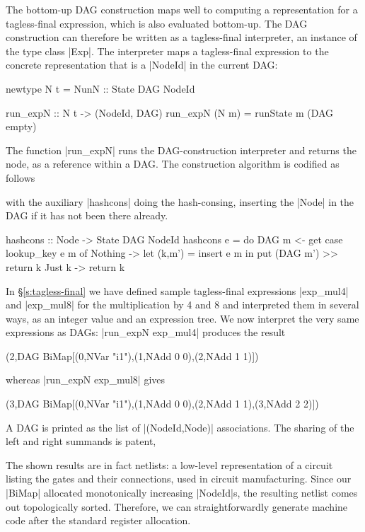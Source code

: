 \documentclass[submission,copyright,creativecommons]{eptcs}
\begin{document}
The bottom-up DAG construction maps well to computing a representation
for a tagless-final expression, which is also evaluated bottom-up. The
DAG construction can therefore be written as a tagless-final
interpreter, an instance of the type class |Exp|. The interpreter maps
a tagless-final expression to the concrete representation that is a
|NodeId| in the current DAG:
\begin{code}
newtype N t = N{unN :: State DAG NodeId}

run_expN :: N t -> (NodeId, DAG)
run_expN (N m) = runState m (DAG empty)
\end{code}
The function |run_expN| runs the DAG-construction interpreter and
returns the node, as a reference within a DAG. The construction
algorithm is codified as follows
with the auxiliary |hashcons| doing the hash-consing, inserting the
|Node| in the DAG if it has not been there already.
\begin{code}
hashcons :: Node -> State DAG NodeId
hashcons e = do
  DAG m <- get
  case lookup_key e m of
    Nothing -> let (k,m') = insert e m
               in put (DAG m') >> return k
    Just k  -> return k
\end{code}

In \S\ref{s:tagless-final} we have defined sample tagless-final
expressions |exp_mul4| and |exp_mul8| for the multiplication by 4 and 8
and interpreted them in several ways, as an integer value and an
expression tree. We now interpret the very same expressions as DAGs:
|run_expN exp_mul4| produces the result
\begin{code}
(2,DAG BiMap[(0,NVar "i1"),(1,NAdd 0 0),(2,NAdd 1 1)])
\end{code}
whereas |run_expN exp_mul8| gives
\begin{code}
(3,DAG BiMap[(0,NVar "i1"),(1,NAdd 0 0),(2,NAdd 1 1),(3,NAdd 2 2)])
\end{code}
A DAG is printed as the list of |(NodeId,Node)| associations. The
sharing of the left and right summands is patent,

The shown results are in fact netlists: a low-level representation of
a circuit listing the gates and their connections, used in circuit
manufacturing. Since our |BiMap| allocated monotonically increasing
|NodeId|s, the resulting netlist comes out topologically sorted.
Therefore, we can straightforwardly generate machine code after the
standard register allocation.
\end{document}
